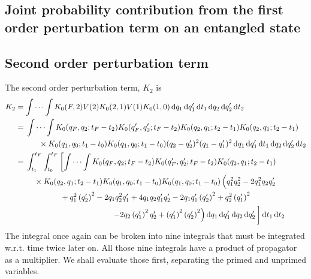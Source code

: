 \subsection{Joint probability contribution from the first order perturbation term on an entangled state}

\subsection{Second order perturbation term}

The second order perturbation term, $K_2$ is
\begin{align}
    K_2 &= \idotsint K_0(F, 2)V(2)K_0(2, 1)V(1)K_0(1, 0)\dd{q_1}\dd{q_1'}\dd{t_1}\dd{q_2}\dd{q_2'}\dd{t_2} \\
    &= \begin{multlined}[t]
        \idotsint K_0(q_F, q_2; t_F - t_2)K_0(q_F', q_2'; t_F - t_2)K_0(q_2, q_1; t_2 - t_1)K_0(q_2, q_1; t_2 - t_1) \\ \times K_0(q_1, q_0; t_1 - t_0)K_0(q_1, q_0; t_1 - t_0)(q_2 - q_2')^2(q_1 - q_1')^2\dd{q_1}\dd{q_1'}\dd{t_1}\dd{q_2}\dd{q_2'}\dd{t_2}
    \end{multlined} \\
    &= \begin{multlined}[t]
        \int_{t_1}^{t_F}\int_{t_0}^{t_F}\left[\idotsint K_0(q_F, q_2; t_F - t_2)K_0(q_F', q_2'; t_F - t_2)K_0(q_2, q_1; t_2 - t_1)\right. \\ \times K_0(q_2, q_1; t_2 - t_1)K_0(q_1, q_0; t_1 - t_0)K_0(q_1, q_0; t_1 - t_0) \left(\vphantom{\left(q_{2}^{\prime}\right)^{2}} q_{1}^{2} q_{2}^{2} - 2 q_{1}^{2} q_{2} q_{2}^{\prime} \right.\\ + q_{1}^{2} \left(q_{2}^{\prime}\right)^{2} - 2 q_{1} q_{2}^{2} q_{1}^{\prime} + 4 q_{1} q_{2} q_{1}^{\prime} q_{2}^{\prime} - 2 q_{1} q_{1}^{\prime} \left(q_{2}^{\prime}\right)^{2} + q_{2}^{2} \left(q_{1}^{\prime}\right)^{2} \\ \left.\left. - 2 q_{2} \left(q_{1}^{\prime}\right)^{2} q_{2}^{\prime} + \left(q_{1}^{\prime}\right)^{2} \left(q_{2}^{\prime}\right)^{2} \right) \dd{q_1}\dd{q_1'}\dd{q_2}\dd{q_2'} \vphantom{\idotsint}\right]\dd{t_1}\dd{t_2}
    \end{multlined}
\end{align}
The integral once again can be broken into nine integrals that must be integrated w.r.t. time twice later on. All those nine integrals have a product of propagator as a multiplier. We shall evaluate those first, separating the primed and unprimed variables.
